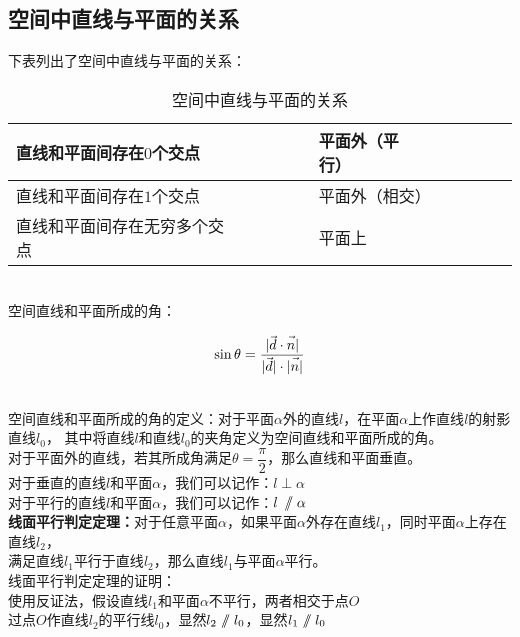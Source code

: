 \documentclass[UTF8]{ctexart}
\let\nvec\vec
\def\vec#1{\nvec{\vphantom b\smash{#1}}}
\renewcommand\parallel{{\hspace{3.0pt}\mathrel{/\mskip-6.5mu/}\hspace{2.6pt}}}
\begin{document}
\newpage

\subsection{空间中直线与平面的关系}
    下表列出了空间中直线与平面的关系：\vspace{5pt}
    \begin{table}[h]
        \begin{center}
            \begin{tabular}{l|l}
                \hline
                直线和平面间存在$0$个交点&平面外（平行）~~~~~~~~\\ \hline
                直线和平面间存在$1$个交点&平面外（相交）\\ \hline
                直线和平面间存在无穷多个交点~~~~~~~~&平面上\\ \hline
            \end{tabular}
            \caption{空间中直线与平面的关系}
        \end{center}
    \end{table}\\
    空间直线和平面所成的角：
    \begin{large}
        \begin{equation*}
            \sin{\theta}=\frac{|\vec{d}\cdot\vec{n}|}{|\vec{d}|\cdot|\vec{n}|}
        \end{equation*}
    \end{large}\\
    空间直线和平面所成的角的定义：对于平面$\alpha$外的直线$l$，在平面$\alpha$上作直线$l$的射影直线$l_0$，
    其中将直线$l$和直线$l_0$的夹角定义为空间直线和平面所成的角。\\[3mm]
    对于平面外的直线，若其所成角满足$\theta=\dfrac{\pi}{2}$，那么直线和平面垂直。\\[4mm]
    对于垂直的直线$l$和平面$\alpha$，我们可以记作：$l\perp\alpha$\\[3mm]
    对于平行的直线$l$和平面$\alpha$，我们可以记作：$l\,\parallel\alpha$\\[5mm]
    \textbf{线面平行判定定理：}对于任意平面$\alpha$，如果平面$\alpha$外存在直线$l_1$，同时平面$\alpha$上存在直线$l_2$，\\
    满足直线$l_1$平行于直线$l_2$，那么直线$l_1$与平面$\alpha$平行。\\[4mm]
    线面平行判定定理的证明：\\[3mm]
    使用反证法，假设直线$l_1$和平面$\alpha$不平行，两者相交于点$O$\\[2mm]
    过点$O$作直线$l_2$的平行线$l_0$，显然$l_2\parallel l_0$，显然$l_1\parallel l_0$\\[2mm]
\end{document}
